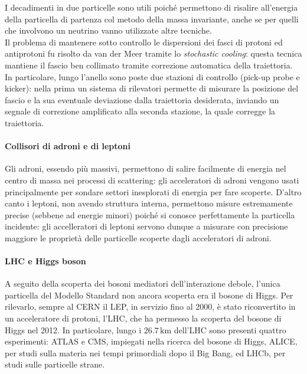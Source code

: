 I decadimenti in due particelle sono utili poiché permettono di risalire all'energia della particella di partenza col metodo della massa invariante, anche se per quelli che involvono un neutrino vanno utilizzate altre tecniche.\\
Il problema di mantenere sotto controllo le dispersioni dei fasci di protoni ed antiprotoni fu risolto da van der Meer tramite lo \textit{stochastic cooling}: questa tecnica mantiene il fascio ben collimato tramite correzione automatica della traiettoria. In particolare, lungo l'anello sono poste due stazioni di controllo (pick-up probe e kicker): nella prima un sistema di rilevatori permette di misurare la posizione del fascio e la sua eventuale deviazione dalla traiettoria desiderata, inviando un segnale di correzione amplificato alla seconda stazione, la quale corregge la traiettoria.

\paragraph{Collisori di adroni e di leptoni}

Gli adroni, essendo più massivi, permettono di salire facilmente di energia nel centro di massa nei processi di scattering: gli acceleratori di adroni vengono usati principalmente per sondare settori inesplorati di energia per fare scoperte. D'altro canto i leptoni, non avendo struttura interna, permettono misure estremamente precise (sebbene ad energie minori) poiché si conosce perfettamente la particella incidente: gli accelleratori di leptoni servono dunque a misurare con precisione maggiore le proprietà delle particelle scoperte dagli acceleratori di adroni.

\paragraph{LHC e Higgs boson}

A seguito della scoperta dei bosoni mediatori dell'interazione debole, l'unica particella del Modello Standard non ancora scoperta era il bosone di Higgs. Per rilevarlo, sempre al CERN il LEP, in servizio fino al 2000, è stato riconvertito in un acceleratore di protoni, l'LHC, che ha permesso la scoperta del bosone di Higgs nel 2012. In particolare, lungo i $ 26.7\,\text{km} $ dell'LHC sono presenti quattro esperimenti: ATLAS e CMS, impiegati nella ricerca del bosone di Higgs, ALICE, per studi sulla materia nei tempi primordiali dopo il Big Bang, ed LHCb, per studi sulle particelle strane.










